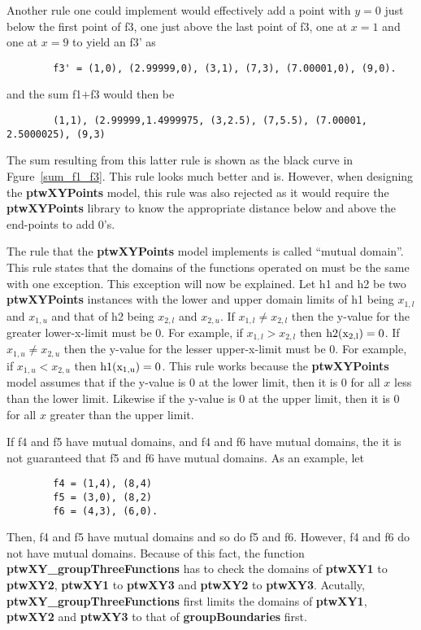\documentclass[11pt]{article}
\newcommand{\highlight}[1]{{\bf #1}}
\begin{document}
Another rule one could implement would effectively add a point with $y = 0$ just below the first point of f3,
one just above the last point of f3, one at $x = 1$ and one at $x = 9$ to yield an f3' as
\begin{verbatim}
        f3' = (1,0), (2.99999,0), (3,1), (7,3), (7.00001,0), (9,0).
\end{verbatim}
and the sum f1$ + $f3 would then be
\begin{verbatim}
        (1,1), (2.99999,1.4999975, (3,2.5), (7,5.5), (7.00001, 2.5000025), (9,3)
\end{verbatim}
The sum resulting from this latter rule is shown as the black curve in Fgure~\ref{sum_f1_f3}. This rule looks much better and is.
However, when designing the \highlight{ptwXYPoints} model, this rule was also rejected as it would require the 
\highlight{ptwXYPoints} library to know the appropriate distance below and above the end-points to add 0's.

The rule that the \highlight{ptwXYPoints} model implements is called ``mutual domain''. This rule states that the
domains of the functions operated on must be the same with one exception. This exception will now be explained. 
Let h1 and h2 be two \highlight{ptwXYPoints} instances with
the lower and upper domain limits of h1 being $x_{1,l}$ and $x_{1,u}$ and that of h2 being $x_{2,l}$ and $x_{2,u}$. 
If $x_{1,l} \ne x_{2,l}$ then the y-value for the greater lower-x-limit must be 0. For example, if
$x_{1,l} > x_{2,l}$ then $\rm{h2}(x_{2,l}) = 0$. If $x_{1,u} \ne x_{2,u}$ then the y-value for the lesser
upper-x-limit must be 0. For example, if $x_{1,u} < x_{2,u}$ then $\rm{h1}(x_{1,u}) = 0$. This rule works because
the \highlight{ptwXYPoints} model assumes that if the y-value is 0 at the lower limit, then it is 0 for all
$x$ less than the lower limit. Likewise if the y-value is 0 at the upper limit, then it is 0 for all
$x$ greater than the upper limit.

If f4 and f5 have mutual domains, and f4 and f6 have mutual domains, the it is not guaranteed that f5 and f6
have mutual domains. As an example, let
\begin{verbatim}
        f4 = (1,4), (8,4)
        f5 = (3,0), (8,2)
        f6 = (4,3), (6,0).
\end{verbatim}
Then, f4 and f5 have mutual domains and so do f5 and f6. However, f4 and f6 do not have mutual domains.
Because of this fact, the function \highlight{ptwXY\_groupThreeFunctions} has to check the domains of \highlight{ptwXY1} to 
\highlight{ptwXY2}, \highlight{ptwXY1} to \highlight{ptwXY3} and \highlight{ptwXY2} to \highlight{ptwXY3}. Acutally,
\highlight{ptwXY\_groupThreeFunctions} first limits the domains of \highlight{ptwXY1}, \highlight{ptwXY2} and
\highlight{ptwXY3} to that of \highlight{groupBoundaries} first.

\end{document}
